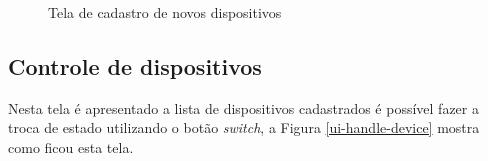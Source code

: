 \begin{figure}[H]
\caption{\label{ui-new-device} Tela de cadastro de novos dispositivos}
\end{figure}

\subsection{Controle de dispositivos}
Nesta tela é apresentado a lista de dispositivos cadastrados é possível fazer a troca de estado utilizando o botão \textit{switch}, a Figura \ref{ui-handle-device} mostra como ficou esta tela.


